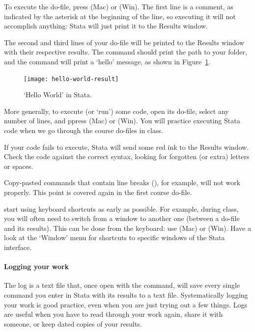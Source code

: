 To execute the do-file, press  (Mac) or  (Win). The first line is a comment, as indicated by the asterisk at the beginning of the line, so executing it will not accomplish anything: Stata will just print it to the Results window.%

The second and third lines of your do-file will be printed to the Results window with their respective results. The  command should print the path to your \SRQM folder, and the  command will print a `hello' message, as shown in Figure~\ref{fig:hello-world-result}.%

\begin{figure}%
  \texttt{[image: hello-world-result]}

  \caption{`Hello World' in Stata.}
  \label{fig:hello-world-result}
\end{figure}

More generally, to execute (or `run') some code, open its do-file, select any number of lines, and ppress  (Mac) or  (Win). You will practice executing Stata code when we go through the course do-files in class.%

 If your code fails to execute, Stata will send some red ink to the Results window. Check the code against the correct syntax, looking for forgotten (or extra) letters or spaces.%

 Copy-pasted commands that contain line breaks (\cmd{///}), for example, will not work properly. This point is covered again in the first course do-file.%

 start using keyboard shortcuts as early as possible. For example, during class, you will often need to switch from a window to another one (between a do-file and its results). This can be done from the keyboard: use  (Mac) or  (Win). Have a look at the `Window' menu for shortcuts to specific windows of the Stata interface.%

\paragraph{Logging your work}

The log is a text file that, once open with the  command, will save every single command you enter in Stata with its results to a text file. Systematically logging your work is good practice, even when you are just trying out a few things. Logs are useful when you have to read through your work again, share it with someone, or keep dated copies of your results.%

